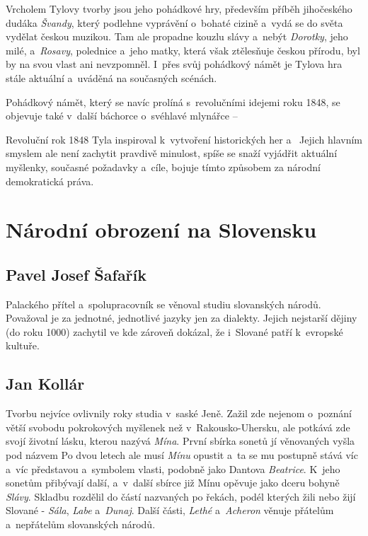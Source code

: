 Vrcholem Tylovy tvorby jsou jeho pohádkové hry, především
 příběh jihočeského dudáka \emph{Švandy}, který
podlehne vyprávění o~bohaté cizině a~vydá se do světa vydělat
 českou muzikou. Tam ale propadne kouzlu slávy a~nebýt
\emph{Dorotky}, jeho milé, a~\emph{Rosavy}, polednice a~jeho matky,
která však ztělesňuje českou přírodu, byl by na svou vlast ani
nevzpomněl. I~přes svůj pohádkový námět je Tylova hra stále aktuální
a~uváděná na současných scénách.

Pohádkový námět, který se navíc prolíná s~revolučními idejemi roku 1848,
se objevuje také v~další báchorce o~svéhlavé mlynářce --

Revoluční rok 1848 Tyla inspiroval k~vytvoření historických her
  
a~ Jejich hlavním smyslem ale není zachytit
pravdivě minulost, spíše se snaží vyjádřit aktuální myšlenky, současné
požadavky a~cíle, bojuje tímto způsobem za národní demokratická práva.

\section{Národní obrození na Slovensku
}
\subsection*{Pavel Josef Šafařík}
Palackého přítel a~spolupracovník  se věnoval
studiu slovanských národů. Považoval je za jednotné, jednotlivé jazyky
jen za dialekty. Jejich nejstarší dějiny (do roku 1000) zachytil ve
 kde zároveň dokázal, že i~Slované
patří k~evropské kultuře.

\subsection*{Jan Kollár}
Tvorbu  nejvíce ovlivnily roky studia
v~saské Jeně. Zažil zde nejenom o~poznání větší svobodu pokrokových
myšlenek než v~Rakousko-Uhersku, ale potkává zde svojí životní lásku,
kterou nazývá \emph{Mína}. První sbírka sonetů jí věnovaných vyšla pod
názvem  Po dvou letech ale musí \emph{Mínu} opustit a~ta se
mu postupně stává víc a~víc představou a~symbolem vlasti, podobně jako
Dantova \emph{Beatrice}. K~jeho sonetům přibývají další, a~v~další
sbírce  již Mínu opěvuje jako dceru bohyně
\emph{Slávy}. Skladbu rozdělil do částí nazvaných po řekách, podél
kterých žili nebo žijí Slované - \emph{Sála}, \emph{Labe}
a~\emph{Dunaj}. Další části, \emph{Lethé} a~\emph{Acheron} věnuje
přátelům a~nepřátelům slovanských národů.